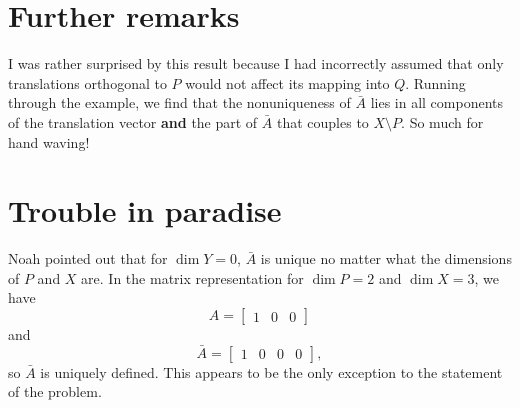 \documentclass[11pt]{article}
\begin{document}
\section{Further remarks}

I was rather surprised by this result because I had incorrectly
assumed that only translations orthogonal to $P$ would not affect its
mapping into $Q$.  Running through the example, we find that the
nonuniqueness of $\bar{A}$ lies in all components of the translation
vector \textbf{and} the part of $\bar{A}$ that couples to $X \setminus
P$.  So much for hand waving!

\section{Trouble in paradise}

Noah pointed out that for $\dim Y = 0$, $\bar{A}$ is unique no matter
what the dimensions of $P$ and $X$ are.  In the matrix representation
for $\dim P = 2$ and $\dim X = 3$, we have
\[ A = [
  \begin{matrix}
    1 & 0 & 0
  \end{matrix}
] \] and
\[ \bar{A} = [
  \begin{matrix}
    1 & 0 & 0 & 0 
  \end{matrix}
], \] so $\bar{A}$ is uniquely defined.  This
appears to be the only exception to the statement of the problem.
\end{document}
